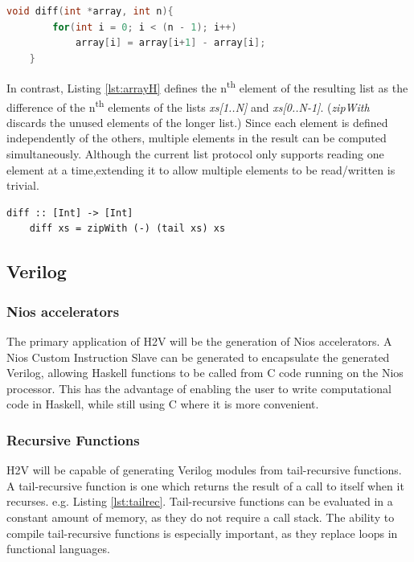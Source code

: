 \documentclass[english,onecolumn]{article}
\begin{document}
\begin{lstlisting}[language=C, caption={Array Bottleneck Example (C).}, label={lst:arrayC}]
    void diff(int *array, int n){
        for(int i = 0; i < (n - 1); i++)
            array[i] = array[i+1] - array[i];
    }
\end{lstlisting}

In contrast, Listing \ref{lst:arrayH} defines the n\textsuperscript{th} element of the resulting list as the difference of the
n\textsuperscript{th} elements of the lists \textit{xs[1..N]} and \textit{xs[0..N-1]}.
(\textit{zipWith} discards the unused elements of the longer list.)
Since each element is defined independently of the others, multiple elements in the result can be computed simultaneously.
Although the current list protocol only supports reading one element at a time,\footnotemark extending it to allow multiple elements to be read/written is trivial. %

\begin{lstlisting}[caption={Array Bottleneck Example (Haskell).}, label={lst:arrayH}]
    diff :: [Int] -> [Int]
    diff xs = zipWith (-) (tail xs) xs
\end{lstlisting}

\subsection{Verilog}
\subsubsection{Nios accelerators}
The primary application of H2V will be the generation of Nios accelerators. A Nios Custom Instruction Slave can be generated to encapsulate the generated Verilog, allowing Haskell functions to be called from C code running on the Nios processor.
This has the advantage of enabling the user to write computational code in Haskell, while still using C where it is more convenient.

\subsubsection{Recursive Functions}
H2V will be capable of generating Verilog modules from tail-recursive functions. A tail-recursive function is one which returns the  result of a call to itself when it recurses. e.g. Listing \ref{lst:tailrec}. Tail-recursive functions can be evaluated in a constant amount of memory, as they do not require a call stack. The ability to compile tail-recursive functions is especially important, as they replace loops in functional languages.
\end{document}
